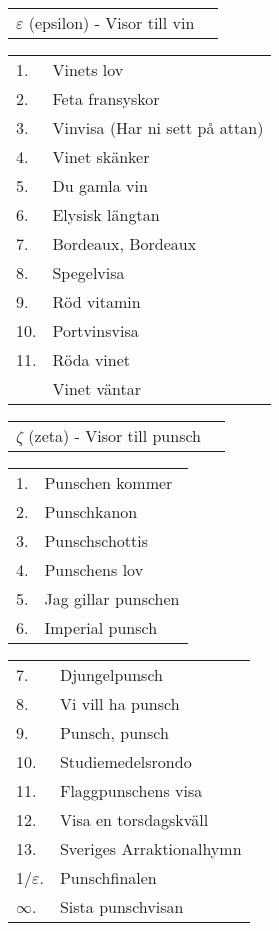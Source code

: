 \documentclass[a6paper,10pt]{article}
\begin{document}
\vspace{-5pt}

\vspace{-10pt}
\begin{table}[!ht]
\begin{tabularx}{1\textwidth}{l X}
\Large $\varepsilon$ (epsilon) - Visor till vin&\\
\end{tabularx}
\end{table}
\begin{table}[!ht]
\begin{tabularx}{1\textwidth}{l X}
1.&Vinets lov\\
2.&Feta fransyskor\\
3.&Vinvisa (Har ni sett på attan)\\
4.&Vinet skänker\\
5.&Du gamla vin\\
6.&Elysisk längtan\\
7.&Bordeaux, Bordeaux\\
8.&Spegelvisa\\
9.&Röd vitamin\\
10.&Portvinsvisa\\
11.&Röda vinet\\
&Vinet väntar
\end{tabularx}
\end{table}
\begin{table}[!ht]
\begin{tabularx}{1\textwidth}{l X}
\Large $\zeta$ (zeta) - Visor till punsch&
\end{tabularx}
\end{table}
\begin{table}[!ht]
\begin{tabularx}{1\textwidth}{l X}
1.&Punschen kommer\\
2.&Punschkanon\\
3.&Punschschottis\\
4.&Punschens lov\\
5.&Jag gillar punschen\\
6.&Imperial punsch
\end{tabularx}
\end{table}
\begin{table}[!ht]
\begin{tabularx}{1\textwidth}{l X}
7.&Djungelpunsch\\
8.&Vi vill ha punsch\\
9.&Punsch, punsch\\
10.&Studiemedelsrondo\\
11.&Flaggpunschens visa\\
12.&Visa en torsdagskväll\\
13.&Sveriges Arraktionalhymn\\
1/$\varepsilon$.&Punschfinalen\\
$\infty$.&Sista punschvisan
\end{tabularx}
\end{table}
\end{document}
